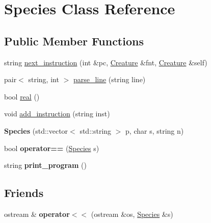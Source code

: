 \hypertarget{classSpecies}{\section{Species Class Reference}
\label{classSpecies}
}
\subsection*{Public Member Functions}
\begin{DoxyCompactItemize}
\item 
string \hyperlink{classSpecies_ad2b5c09ce528d3310d9c0ee144a56aa5}{next\-\_\-instruction} (int \&pc, \hyperlink{classCreature}{Creature} \&fnt, \hyperlink{classCreature}{Creature} \&self)
\item 
pair$<$ string, int $>$ \hyperlink{classSpecies_ad9bc32bb3eb1039bb45630f1845ea9d3}{parse\-\_\-line} (string line)
\item 
bool \hyperlink{classSpecies_ac458aa1dfe5f7a72686323339f8412ec}{real} ()
\item 
void \hyperlink{classSpecies_a2578012dea60323f75b03a65dc7ba54e}{add\-\_\-instruction} (string inst)
\item 
\hypertarget{classSpecies_a67e8788a43c9f8052203cc8c7dadbf3c}{{\bfseries Species} (std\-::vector$<$ std\-::string $>$ p, char s, string n)}\label{classSpecies_a67e8788a43c9f8052203cc8c7dadbf3c}

\item 
\hypertarget{classSpecies_a1c655e6b935bb1da8cbfb5ed19e00883}{bool {\bfseries operator==} (\hyperlink{classSpecies}{Species} s)}\label{classSpecies_a1c655e6b935bb1da8cbfb5ed19e00883}

\item 
\hypertarget{classSpecies_a33c2bb360c575715c3c6b024fb5cbdfa}{string {\bfseries print\-\_\-program} ()}\label{classSpecies_a33c2bb360c575715c3c6b024fb5cbdfa}

\end{DoxyCompactItemize}
\subsection*{Friends}
\begin{DoxyCompactItemize}
\item 
\hypertarget{classSpecies_ac6d1502d576ef504996fbbff277fce11}{ostream \& {\bfseries operator$<$$<$} (ostream \&os, \hyperlink{classSpecies}{Species} \&s)}\label{classSpecies_ac6d1502d576ef504996fbbff277fce11}

\end{DoxyCompactItemize}


